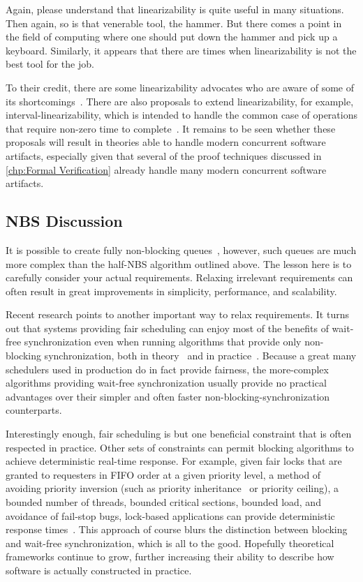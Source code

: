 Again, please understand that linearizability is quite useful in many
situations.
Then again, so is that venerable tool, the hammer.
But there comes a point in the field of computing where one should put
down the hammer and pick up a keyboard.
Similarly, it appears that there are times when linearizability is not
the best tool for the job.

To their credit, there are some linearizability advocates who are aware
of some of its shortcomings~\cite{SergioRajsbaum2020HistoryLinearizability}.
There are also proposals to extend linearizability, for example,
interval-linearizability, which is intended to handle the common case
of operations that require non-zero time to
complete~\cite{10.1145/3266457}.
It remains to be seen whether these proposals will result in theories
able to handle modern concurrent software artifacts, especially given
that several of the proof techniques discussed in \cref{chp:Formal
Verification} already handle many modern concurrent software artifacts.

\subsection{NBS Discussion}
\label{sec:advsync:NBS Discussion}

It is possible to create fully non-blocking queues~\cite{MichaelScott96},
however, such queues are much more complex than the half-NBS algorithm
outlined above.
The lesson here is to carefully consider your actual requirements.
Relaxing irrelevant requirements can often result in great
improvements in simplicity, performance, and scalability.

Recent research points to another important way to relax requirements.
It turns out that systems providing fair scheduling can enjoy most
of the benefits of wait-free synchronization even when running
algorithms that provide only non-blocking
synchronization, both in theory~\cite{DanAlitarh2013PracticalProgress}
and in practice~\cite{SamyAlBahra2013NBS}.
Because a great many schedulers used in production do in fact
provide fairness,
the more-complex algorithms providing wait-free synchronization
usually provide no practical advantages over their simpler
and often faster non-blocking-synchronization counterparts.

Interestingly enough, fair scheduling is but one beneficial
constraint that is often respected in practice.
Other sets of constraints can permit blocking algorithms to
achieve deterministic real-time response.
For example, given fair locks that are granted to requesters in FIFO order at
a given priority level,
a method of avoiding priority inversion (such as priority
inheritance~\cite{Takada:1995:RSN:527074.828566,Cai-DongWang1996PrioInherLock}
or priority ceiling), a bounded number of threads,
bounded critical sections,
bounded load,
and avoidance of fail-stop bugs,
lock-based applications can provide deterministic
response times~\cite{BjoernBrandenburgPhD,DipankarSarma2004OLSscalability}.
This approach of course blurs the distinction between blocking and wait-free
synchronization, which is all to the good.
Hopefully theoretical frameworks continue to grow, further increasing
their ability to
describe how software is actually constructed in practice.


